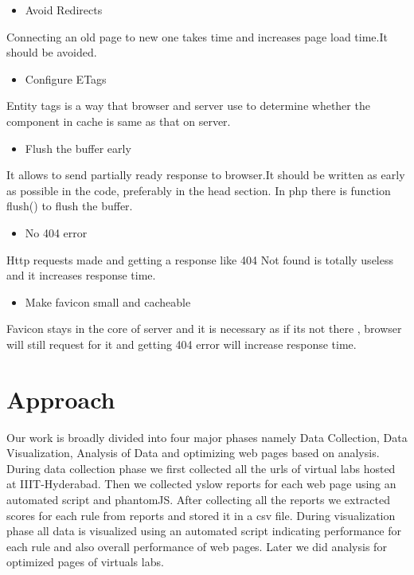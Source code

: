 \documentclass[11pt]{article}
\begin{document}
\begin{itemize}
\item Avoid Redirects
\end{itemize}
Connecting an old page to new one takes time  and increases page load time.It should be avoided.

\begin{itemize}
\item Configure ETags
\end{itemize}
Entity tags is a way that browser and server use to determine whether the component in cache is same as that on server.

\begin{itemize}
\item Flush the buffer early
\end{itemize}
It allows to send partially ready response to browser.It should be written as early as possible in the code, preferably in the head section.
In php there is function flush() to flush the buffer. 

\begin{itemize}
\item No 404 error
\end{itemize}
Http requests made and getting a response like 404 Not found is totally useless and it increases response time.

\begin{itemize}
\item Make favicon small and cacheable
\end{itemize}
Favicon stays in the core of server and  it is necessary as if its not there , browser will still request for it and getting 404 error will increase response time.


\section{Approach}
\label{sec-4}


Our work is broadly divided into four major phases namely Data Collection, Data Visualization, Analysis of Data and optimizing web pages based on analysis. During data collection phase we first collected all the urls of virtual labs hosted at IIIT-Hyderabad. Then we collected yslow reports for each web page using an automated script and phantomJS. After collecting all the reports we extracted scores for each rule from reports and stored it in a csv file. During visualization phase all data is visualized using an automated script indicating performance for each rule and also overall performance of web pages. Later we did analysis for optimized pages of virtuals labs.
\end{document}
